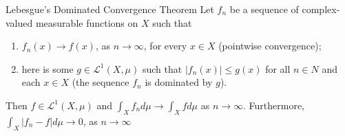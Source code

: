 \documentclass{beamer}%
\theoremstyle{definition}
\begin{document}
\begin{frame}{Lebesgue’s Dominated Convergence Theorem}
Let $f_n$ be a sequence of complex-valued measurable functions on $X$ such that
\begin{enumerate}
    \item $f_n(x) \rightarrow f(x)$, as $n \rightarrow \infty$, for every $x \in X$ (pointwise convergence);
    \item here is some $g \in \mathcal{L}^1(X,\mu)$ such that $|f_n(x)| \leq g(x)$ for all $n \in N$
and each $x \in X$ (the sequence $f_n$ is dominated by $g$).

\end{enumerate}
Then $ f \in \mathcal{L}^1(X,\mu)$ and $\int_X f_n d\mu \rightarrow \int_X f d\mu$ as $n \rightarrow \infty$. Furthermore, $\int_X |f_n - f| d\mu \rightarrow 0$, as $n \rightarrow \infty$

    
\end{frame}
\end{document}
